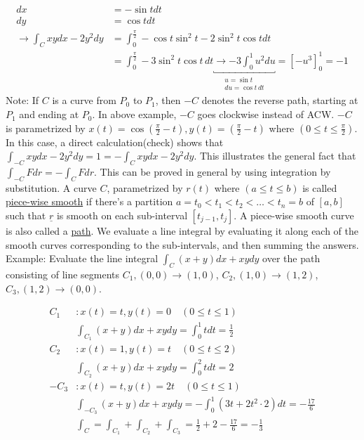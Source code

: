 \documentclass{article}
\newcommand{\n}{\leavevmode \newline} %
\newcommand{\nn}{\leavevmode \newline \newline} %
\numberwithin{equation}{subsection} %
\begin{document}
\begin{equation}
    \begin{split}
        dx &= -\sin{t}dt \\
        dy &= \cos{t}dt \\
        \to \int_C xydx-2y^2dy &= \int_0^{\frac{\pi}{2}} -\cos{t}\sin^2{t}-2\sin^2{t}\cos{t} dt
        \\
        &= \int_0^{\frac{\pi}{2}} -3\sin^2{t}\cos{t} \,dt
        \underbracket{\longrightarrow -3\int_0^1 u^2du}_{\begin{array}{l}
        u=\sin{t}\\du=\cos{t}\,dt
        \end{array}} = \left[ -u^3 \right]_0^1 = -1
    \end{split}
\end{equation}
\n
Note: If $C$ is a curve from $P_0$ to $P_1$, then $-C$ denotes the reverse path, starting at $P_1$ and ending at $P_0$. In above example, $-C$ goes clockwise instead of ACW. $-C$ is parametrized by $x(t)=\cos(\frac{\pi}{2}-t), y(t)=(\frac{\pi}{2}-t)$ where $(0 \leq t \leq \frac{\pi}{2})$. In this case, a direct calculation(check) shows that $ \int _{-C} xydx-2y^2dy = 1 = -\int_C xydx-2y^2dy$. This illustrates the general fact that $\int_{-C} Fdr = -\int_C Fdr$. This can be proved in general by using integration by substitution.
\nn
A curve $C$, parametrized by $r(t)$ where $(a \leq t \leq b)$ is called \underline{piece-wise smooth} if there's a partition $a=t_0<t_1<t_2<\ldots<t_n=b$ of $[a,b]$ such that $\underline{r}$ is smooth on each sub-interval $[t_{j-1},t_j]$. A piece-wise smooth curve is also called a \underline{path}. We evaluate a line integral by evaluating it along each of the smooth curves corresponding to the sub-intervals, and then summing the answers.
\nn
Example: Evaluate the line integral $\int_C (x+y)dx +xydy$ over the path consisting of line segments $C_1, (0,0)\to(1,0)$, $C_2,(1,0)\to(1,2)$, $C_3,(1,2)\to(0,0)$.

\begin{equation}
    \begin{split}
        C_1&: x(t)=t,y(t)=0 \quad (0\leq t \leq 1) \\
        &\int_{C_1} (x+y)dx + xydy = \int_0^1 tdt = \frac{1}{2}
        \\
        C_2&: x(t)=1,y(t)=t \quad (0 \leq t \leq 2) \\
        &\int_{C_2} (x+y)dx + xydy = \int_0^2 tdt = 2
        \\
        -C_3&: x(t)=t,y(t)=2t \quad (0 \leq t \leq 1) \\
        &\int_{-C_3} (x+y)dx + xydy = -\int_0^1 (3t+2t^2\cdot 2)dt = -\frac{17}{6}\\
        &\int_C = \int_{C_1} + \int_{C_2} + \int_{C_3} = \frac{1}{2} + 2 -\frac{17}{6} = -\frac{1}{3}
    \end{split}
\end{equation}
\end{document}

